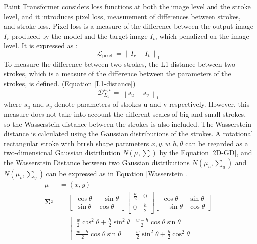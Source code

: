 Paint Transformer considers loss functions at both the image level and the 
stroke level, and it introduces pixel loss, measurement of differences between
strokes, and stroke loss.
Pixel loss is a measure of the difference between the output image $I_r$ produced 
by the model and the target image $I_t$, which penalized on the image level.
It is expressed as :
\begin{equation}
    \mathcal{L}_{\text {pixel }}=\left\|I_r-I_t\right\|_1
\end{equation}
To measure the difference between two strokes, the L1 distance between two 
strokes, which is a measure of the difference between the parameters of the 
strokes, is defined. (Equation \ref{L1-distance})
\begin{equation}
    \label{L1-distance}
    \mathcal{D}_{L_1}^{u, v}=\left\|s_u-s_v\right\|_1
\end{equation}
where $s_u$ and $s_v$ denote parameters of strokes u and v respectively. 
However, this measure does not take into account the different scales of 
big and small strokes, so the Wasserstein distance between the strokes is also 
included. The Wasserstein distance is calculated using the Gaussian distributions
of the strokes. 
A rotational rectangular stroke with brush shape parameters ${x, y, w, h, \theta}$
can be regarded as a two-dimensional Gaussian distribution $N(\mu, \sum)$ by the 
Equation \ref{2D-GD}, and the Wasserstein Distance between two Gaussian 
distributions $N(\mu_u, \sum_u)$ and $N(\mu_v, \sum_v)$ can be expressed as in 
Equation \ref{Wasserstein}.
\begin{equation}
    \label{2D-GD}
    \begin{aligned} \mu & =(x, y) \\ \boldsymbol{\Sigma}^{\frac{1}{2}} & =\left[\begin{array}{cc}\cos \theta & -\sin \theta \\ \sin \theta & \cos \theta\end{array}\right]\left[\begin{array}{cc}\frac{w}{2} & 0 \\ 0 & \frac{h}{2}\end{array}\right]\left[\begin{array}{cc}\cos \theta & \sin \theta \\ -\sin \theta & \cos \theta\end{array}\right] \\ & =\left[\begin{array}{cc}\frac{w}{2} \cos ^2 \theta+\frac{h}{2} \sin ^2 \theta & \frac{w-h}{2} \cos \theta \sin \theta \\ \frac{w-h}{2} \cos \theta \sin \theta & \frac{w}{2} \sin ^2 \theta+\frac{h}{2} \cos ^2 \theta\end{array}\right]\end{aligned}
\end{equation}
